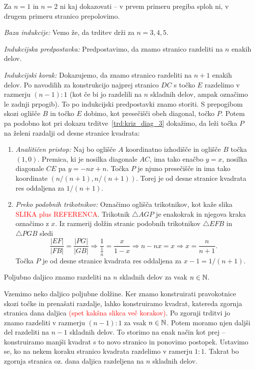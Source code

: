 \begin{dokaz}
    Za $n = 1$ in $n = 2$ ni kaj dokazovati -- v prvem primeru pregiba sploh ni, v drugem primeru stranico prepolovimo.

    \textit{Baza indukcije:} Vemo že, da trditev drži za $n = 3, 4, 5$.

    \textit{Indukcijska predpostavka:} Predpostavimo, da znamo stranico razdeliti na $n$ enakih delov.

    \textit{Indukcijski korak:} Dokazujemo, da znamo stranico razdeliti na $n+1$ enakih delov. Po navodilih za konstrukcijo najprej stranico $DC$ s točko $E$ razdelimo v razmerju $(n-1):1$ (kot če bi jo razdelili na $n$ skladnih delov, ampak označimo le zadnji prpogib). To po indukcijski predpostavki znamo storiti. S prepogibom skozi oglišče $B$ in točko $E$ dobimo, kot presečišči obeh diagonal, točko $P$. Potem pa podobno kot pri dokazu trditve~\ref{trd:kriz_diag_3} dokažimo, da leži točka $P$ na želeni razdalji od desne stranice kvadrata:
    \begin{enumerate}
        \item \textit{Analitičen pristop:} Naj bo oglišče $A$ koordinatno izhodišče in oglišče $B$ točka $(1, 0)$. Premica, ki je nosilka diagonale $AC$, ima tako enačbo $y = x$, nosilka diagonale $CE$ pa $y = -nx + n$. Točka $P$ je njuno presečišče in ima tako koordinate $(n/(n+1), n/(n+1))$. Torej je od desne stranice kvadrata res oddaljena za $1/(n+1)$.
        \item \textit{Preko podobnih trikotnikov:} Označimo oglišča trikotnikov, kot kaže slika \textcolor{red}{SLIKA plus REFERENCA}. Trikotnik $\triangle AGP$ je enakokrak in njegova kraka označimo z $x$. Iz razmerij dolžin stranic podobnih trikotnikov $\triangle EFB$ in $\triangle PGB$ sledi
        $$ \frac{|EF|}{|FB|} = \frac{|PG|}{|GB|} \Rightarrow \frac{1}{\frac{1}{n}} = \frac{x}{1 - x} \Rightarrow n - nx = x \Rightarrow x = \frac{n}{n+1}. $$
        Točka $P$ je od desne stranice kvadrata res oddaljena za $x - 1 = 1/(n + 1)$.
    \end{enumerate}

\end{dokaz}

\begin{posledica}
    Poljubno daljico znamo razdeliti na $n$ skladnih delov za vsak $n \in \mathbb N$.
\end{posledica}

\begin{dokaz}
    Vzemimo neko daljico poljubne dolžine. Ker znamo konstruirati pravokotnice skozi točke in prenašati razdalje, lahko konstruiramo kvadrat, katereda zgornja stranica dana daljica \textcolor{red}{(spet kakšna slikca več korakov)}. Po zgornji trditvi jo znamo razdeliti v razmerju $(n-1) : 1$ za vsak $n \in \mathbb N$. Potem moramo njen daljši del razdeliti na $n-1$ skladnih delov. To storimo na enak način kot prej -- konstruiramo manjši kvadrat s to novo stranico in ponovimo postopek. Ustavimo se, ko na nekem koraku stranico kvadrata razdelimo v ramerju $1:1$. Takrat bo zgornja stranica oz. dana daljica razdeljena na $n$ skladnih delov.
\end{dokaz}

